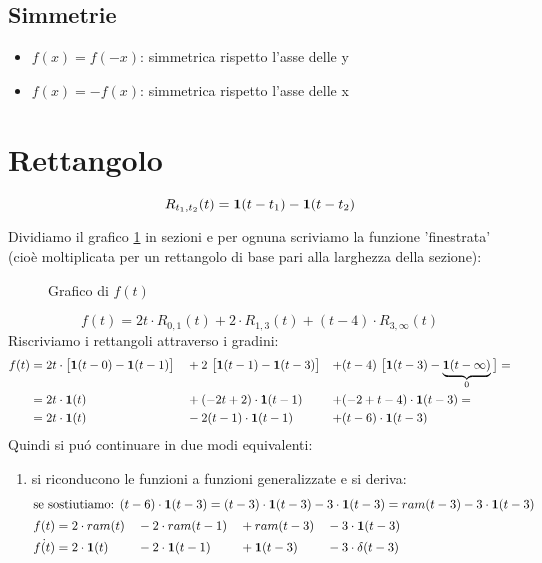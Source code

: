 \documentclass[../main.tex]{subfiles}
\begin{document}
	\subsection{Simmetrie}
		\begin{itemize}
			\item $ f(x) = f(-x) $: simmetrica rispetto l'asse delle y
			\item $ f(x) = -f(x) $: simmetrica rispetto l'asse delle x  	
		\end{itemize}
	\section{Rettangolo}
		$$ R_{t_{1},t_{2}}(t) = \gr[t - t_{1}] - \gr[t - t_{2}] $$
		
	\begin{Exercise}[title={Derivata di una funzione definita a tratti}, difficulty=3]
		Dividiamo il grafico \ref{fig:grafico_f} in sezioni e per ognuna scriviamo la funzione 'finestrata' (cioè moltiplicata per un rettangolo di base pari alla larghezza della sezione):
		\begin{figure}[H]
			\centering
			\resizebox{.4\columnwidth}{!}{}
			\caption{Grafico di $ f(t) $}
			\label{fig:grafico_f}
		\end{figure}
		$$ f(t) = 2t \cdot R_{0,1}(t) + 2 \cdot R_{1,3}(t) + (t-4) \cdot R_{3,\infty}(t) $$
		Riscriviamo i rettangoli attraverso i gradini:
		\begin{align*}
			f(t) &= 2t \cdot \big[ \gr[t-0] - \gr[t-1] \big] &&+ 2\ \big[\gr[t-1] - \gr[t-3]\big] & +&(t-4)\ \big[\gr[t-3] - \underbrace{\gr[t - \infty]}_{0} \big] =\\
			&= 2t \cdot \gr[t] &&+ (-2t+2) \cdot \gr[t-1] & +&(-2+t-4) \cdot \gr[t-3] =\\
			&= 2t \cdot \gr[t] &&- 2(t-1) \cdot \gr[t-1] & +&(t-6) \cdot \gr[t-3]
		\end{align*}
		Quindi si pu\'o continuare in due modi equivalenti:
		\begin{enumerate}
			\item si riconducono le funzioni a funzioni generalizzate e si deriva:
				\begin{align}
					\intertext{se sostiutiamo: $ (t-6) \cdot \gr[t-3] = (t-3) \cdot \gr[t-3] - 3 \cdot \gr[t-3] = ram(t-3) - 3 \cdot \gr[t-3] $}
					f(t) &= 2 \cdot ram(t) &&- 2 \cdot ram(t-1) &&+ram(t-3) &&- 3 \cdot \gr[t-3] \nonumber\\
					\dot{f(t)} &= 2 \cdot \textbf{1}(t) &&- 2 \cdot \gr[t-1] &&+ \gr[t-3] && - 3 \cdot \delta(t-3)

\end{align}
\end{enumerate}
\end{Exercise}
\end{document}
